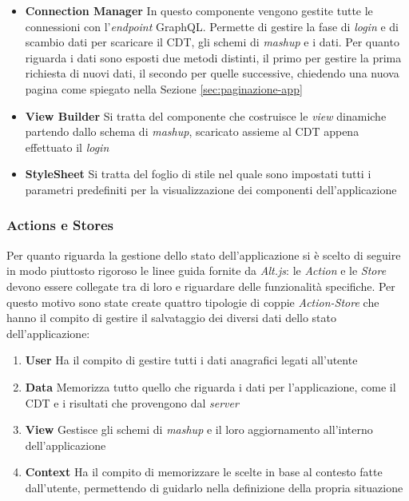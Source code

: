 \begin{itemize}
	\item \textbf{Connection Manager}
	In questo componente vengono gestite tutte le connessioni con l'\emph{endpoint} GraphQL. Permette di gestire la fase di \emph{login} e di scambio dati per scaricare il CDT, gli schemi di \emph{mashup} e i dati. Per quanto riguarda i dati sono esposti due metodi distinti, il primo per gestire la prima richiesta di nuovi dati, il secondo per quelle successive, chiedendo una nuova pagina come spiegato nella Sezione \ref{sec:paginazione-app}
	\item \textbf{View Builder}
	Si tratta del componente che costruisce le \emph{view} dinamiche partendo dallo schema di \emph{mashup}, scaricato assieme al CDT appena effettuato il \emph{login}	
	\item \textbf{StyleSheet}
	Si tratta del foglio di stile nel quale sono impostati tutti i parametri predefiniti per la visualizzazione dei componenti dell'applicazione
\end{itemize}

\subsubsection{Actions e Stores\label{sec:action-store}}
Per quanto riguarda la gestione dello stato dell'applicazione si è scelto di seguire in modo piuttosto rigoroso le linee guida fornite da \emph{Alt.js}: le \emph{Action} e le \emph{Store} devono essere collegate tra di loro e riguardare delle funzionalità specifiche.
Per questo motivo sono state create quattro tipologie di coppie \emph{Action-Store} che hanno il compito di gestire il salvataggio dei diversi dati dello stato dell'applicazione: 
\begin{enumerate}
	\item \textbf{User} Ha il compito di gestire tutti i dati anagrafici legati all'utente
	\item \textbf{Data} Memorizza tutto quello che riguarda i dati per l'applicazione, come il CDT e i risultati che provengono dal \emph{server}
	\item \textbf{View} Gestisce gli schemi di \emph{mashup} e il loro aggiornamento all'interno dell'applicazione
	\item \textbf{Context} Ha il compito di memorizzare le scelte in base al contesto fatte dall'utente, permettendo di guidarlo nella definizione della propria situazione
\end{enumerate}

